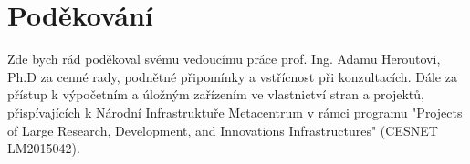 \documentclass[czech]{ExcelAtFIT} %
\begin{document}
\section{Poděkování}
Zde bych rád poděkoval svému vedoucímu práce prof. Ing. Adamu Heroutovi, Ph.D za cenné rady, podnětné připomínky a vstřícnost při konzultacích. Dále za přístup k výpočetním a úložným zařízením ve vlastnictví stran a projektů, přispívajících k Národní Infrastruktuře Metacentrum v rámci programu "Projects of Large Research, Development, and Innovations Infrastructures" (CESNET LM2015042).




\end{document}
